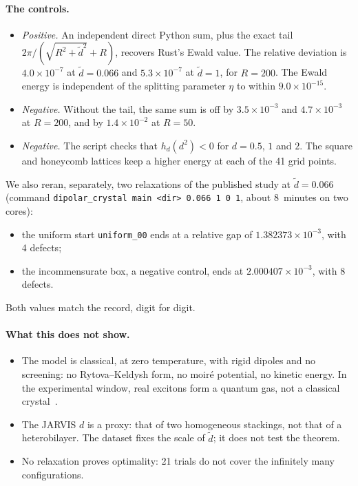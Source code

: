 \paragraph{The controls.}
\begin{itemize}
\item \emph{Positive.} An independent direct Python sum, plus the exact tail $2\pi/(\sqrt{R^2+\tilde
d^2}+R)$, recovers Rust's Ewald value. The relative deviation is $4.0\times10^{-7}$ at $\tilde d=0.066$ and
$5.3\times10^{-7}$ at $\tilde d=1$, for $R=200$. The Ewald energy is independent of the splitting
parameter $\eta$ to within $9.0\times10^{-15}$.
\item \emph{Negative.} Without the tail, the same sum is off by $3.5\times10^{-3}$ and $4.7\times10^{-3}$ at
$R=200$, and by $1.4\times10^{-2}$ at $R=50$.
\item \emph{Negative.} The script checks that $h_d(d^2)<0$ for $d=0.5$, $1$ and $2$. The square and honeycomb
lattices keep a higher energy at each of the 41 grid points.
\end{itemize}
We also reran, separately, two relaxations of the published study at $\tilde d=0.066$ (command
\texttt{dipolar\_crystal main <dir> 0.066 1 0 1}, about 8~minutes on two cores):
\begin{itemize}
\item the uniform start \texttt{uniform\_00} ends at a relative gap of $1.382373\times10^{-3}$, with 4 defects;
\item the incommensurate box, a negative control, ends at $2.000407\times10^{-3}$, with 8 defects.
\end{itemize}
Both values match the record, digit for digit.

\paragraph{What this does not show.}
\begin{itemize}
\item The model is classical, at zero temperature, with rigid dipoles and no screening: no
Rytova--Keldysh form, no moiré potential, no kinetic energy. In the experimental window, real excitons
form a quantum gas, not a classical crystal~\cite{ch5:wang}.
\item The JARVIS $d$ is a proxy: that of two homogeneous stackings, not that of a heterobilayer. The
dataset fixes the scale of $\tilde d$; it does not test the theorem.
\item No relaxation proves optimality: 21 trials do not cover the infinitely many configurations.
\end{itemize}

